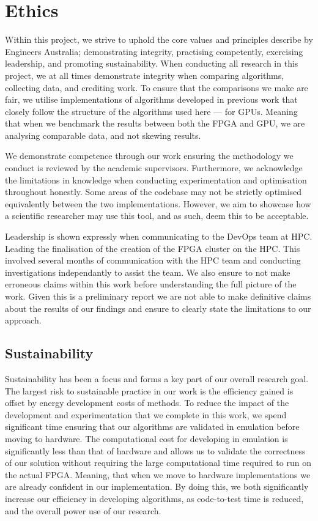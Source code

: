 \documentclass[11pt, a4paper]{article}
\begin{document}
	\section{Ethics}
	Within this project, we strive to uphold the core values and principles describe by Engineers Australia; demonstrating integrity, practising competently, exercising leadership, and promoting sustainability. When conducting all research in this project, we at all times demonstrate integrity when comparing algorithms, collecting data, and crediting work. To ensure that the comparisons we make are fair, we utilise implementations of algorithms developed in previous work that closely follow the structure of the algorithms used here --- for GPUs. Meaning that when we benchmark the results between both the FPGA and GPU, we are analysing comparable data, and not skewing results. 
	
	We demonstrate competence through our work ensuring the methodology we conduct is reviewed by the academic supervisors. Furthermore, we acknowledge the limitations in knowledge when conducting experimentation and optimisation throughout honestly. Some areas of the codebase may not be strictly optimised equivalently between the two implementations. However, we aim to showcase how a scientific researcher may use this tool, and as such, deem this to be acceptable.
	
	Leadership is shown expressly when communicating to the DevOps team at HPC. Leading the finalisation of the creation of the FPGA cluster on the HPC. This involved several months of communication with the HPC team and conducting investigations independantly to assist the team. We also ensure to not make erroneous claims within this work before understanding the full picture of the work. Given this is a preliminary report we are not able to make definitive claims about the results of our findings and ensure to clearly state the limitations to our approach.
	
	\subsection{Sustainability}\label{sec:sustainability}
	Sustainability has been a focus and forms a key part of our overall research goal. The largest risk to sustainable practice in our work is the efficiency gained is offset by energy development costs of methods. To reduce the impact of the development and experimentation that we complete in this work, we spend significant time ensuring that our algorithms are validated in emulation before moving to hardware. The computational cost for developing in emulation is significantly less than that of hardware and allows us to validate the correctness of our solution without requiring the large computational time required to run on the actual FPGA. Meaning, that when we move to hardware implementations we are already confident in our implementation. By doing this, we both significantly increase our efficiency in developing algorithms, as code-to-test time is reduced, and the overall power use of our research. 
	
\end{document}
